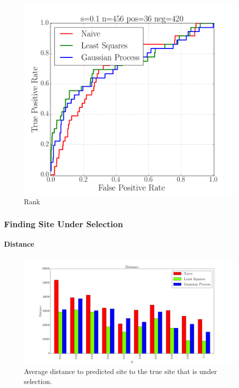 \begin{figure}[H]
  \centering
    \includegraphics[width=\textwidth]{roc01}
  \caption{Rank}
  \label{fig:Fig3}
\end{figure}


\subsubsection{Finding Site Under Selection}
\paragraph{Distance}
\begin{figure}[H]
  \centering
    \includegraphics[width=\textwidth]{dist}
  \caption{Average distance to predicted site to the true site that is under selection.}
  \label{fig:Fig1}
\end{figure}


